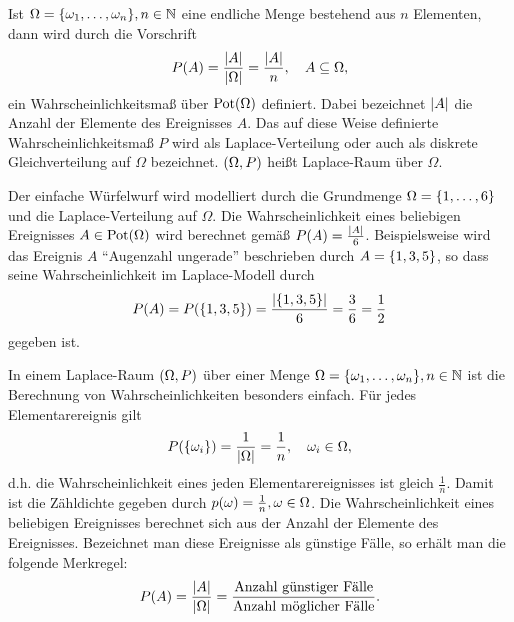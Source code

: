 \documentclass{lecture}
\begin{document}
    \begin{example}
        Ist \(\Omega = \braces*{\omega_1, \ldots, \omega_n}, n \in \N\) eine endliche Menge bestehend aus \(n\) Elementen, dann wird durch die Vorschrift
        \[
            P\parentheses*{A} = \frac{\absolute*{A}}{\absolute*{\Omega}} = \frac{\absolute*{A}}{n}, \quad A \subseteq \Omega,
        \]
        ein Wahrscheinlichkeitsmaß über \(\Pot\parentheses*{\Omega}\) definiert.
        Dabei bezeichnet \(\absolute*{A}\) die Anzahl der Elemente des Ereignisses \(A\).
        Das auf diese Weise definierte Wahrscheinlichkeitsmaß \(P\) wird als Laplace-Verteilung oder auch als diskrete Gleichverteilung auf \(\Omega\) bezeichnet.
        \(\parentheses*{\Omega, P}\) heißt Laplace-Raum über \(\Omega\).
    \end{example}

    \begin{example}
        Der einfache Würfelwurf wird modelliert durch die Grundmenge \(\Omega = \braces*{1, \ldots, 6}\) und die Laplace-Verteilung auf \(\Omega\).
        Die Wahrscheinlichkeit eines beliebigen Ereignisses \(A \in \text{Pot}\parentheses*{\Omega}\) wird berechnet gemäß \(P\parentheses*{A} = \frac{\absolute*{A}}{6}\).
        Beispielsweise wird das Ereignis \(A\) ``Augenzahl ungerade'' beschrieben durch \(A = \braces*{1, 3, 5}\), so dass seine Wahrscheinlichkeit im Laplace-Modell durch
        \[
            P\parentheses*{A} = P\parentheses*{\braces*{1, 3, 5}} = \frac{\absolute*{\braces*{1, 3, 5}}}{6} = \frac{3}{6} = \frac{1}{2}
        \]
        gegeben ist.
    \end{example}

    In einem Laplace-Raum \(\parentheses*{\Omega, P}\) über einer Menge \(\Omega = \braces*{\omega_1, \ldots, \omega_n}, n \in \N\) ist die Berechnung von Wahrscheinlichkeiten besonders einfach.
    Für jedes Elementarereignis gilt
    \[
        P\parentheses*{\braces*{\omega_i}} = \frac{1}{\absolute*{\Omega}} = \frac{1}{n}, \quad \omega_i \in \Omega,
    \]
    d.h. die Wahrscheinlichkeit eines jeden Elementarereignisses ist gleich \(\frac{1}{n}\).
    Damit ist die Zähldichte gegeben durch \(p\parentheses*{\omega} = \frac{1}{n}, \omega \in \Omega\).
    Die Wahrscheinlichkeit eines beliebigen Ereignisses berechnet sich aus der Anzahl der Elemente des Ereignisses.
    Bezeichnet man diese Ereignisse als günstige Fälle, so erhält man die folgende Merkregel:
    \[
        P\parentheses*{A} = \frac{\absolute*{A}}{\absolute*{\Omega}} = \frac{\text{Anzahl günstiger Fälle}}{\text{Anzahl möglicher Fälle}}.
    \]
\end{document}
